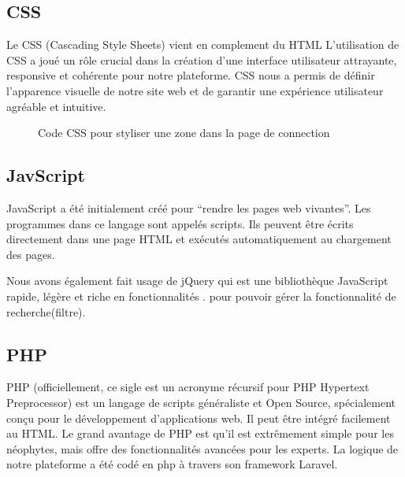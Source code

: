 \subsection{CSS}
Le CSS (Cascading Style Sheets) vient en complement du HTML \cite{powell2010html} 
L'utilisation de CSS a joué un rôle crucial dans la création d'une interface utilisateur attrayante, responsive et cohérente pour notre plateforme. CSS nous a permis de définir l'apparence visuelle de notre site web et de garantir une expérience utilisateur agréable et intuitive.
\begin{figure}[H]%
    \center%
    \setlength{\fboxsep}{5pt}%
    \setlength{\fboxrule}{0.5pt}%
    \caption{Code CSS pour styliser une zone dans la page de connection}%
\end{figure}

\subsection{JavScript}
JavaScript a été initialement créé pour “rendre les pages web vivantes”.
Les programmes dans ce langage sont appelés scripts. Ils peuvent être écrits directement dans une page HTML et exécutés automatiquement au chargement des pages. \cite{infojs}\par 

Nous avons également fait usage de jQuery qui est une bibliothèque JavaScript rapide, légère et riche en fonctionnalités\cite{jqueryinfo} . pour pouvoir gérer la fonctionnalité de recherche(filtre).


\subsection{PHP}
PHP (officiellement, ce sigle est un acronyme récursif pour PHP Hypertext Preprocessor) est un langage de scripts généraliste et Open Source, spécialement conçu pour le développement d'applications web. Il peut être intégré facilement au HTML.
Le grand avantage de PHP est qu'il est extrêmement simple pour les néophytes, mais offre des fonctionnalités avancées pour les experts\cite{infoPHP}.
La logique de notre plateforme a été codé en php à travers son framework Laravel.

